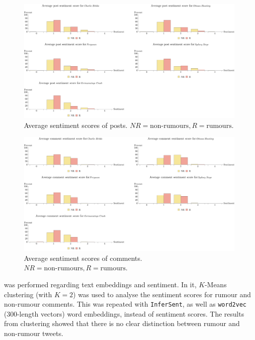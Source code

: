 \begin{figure}[h]
  \myfloatalign
  \includegraphics[width={\textwidth + \marginparsep + \marginparwidth}]{gfx/Experiment_2_1}
  \caption{Average sentiment scores of posts. $NR=\textrm{non-rumours}, R=\textrm{rumours}$.}
  \label{fig:3-exp-2.1}
\end{figure}

\begin{figure}[h]
  \myfloatalign
  \includegraphics[width={\textwidth + \marginparsep + \marginparwidth}]{gfx/Experiment_2_1_comments}
  \caption{Average sentiment scores of comments. $NR=\textrm{non-rumours}, R=\textrm{rumours}$.}
  \label{fig:3-exp-2.1c}
\end{figure}

 was performed regarding text embeddings and sentiment. In it, $K$-Means clustering (with $K=2$) was used to analyse the sentiment scores for rumour and non-rumour comments. This was repeated with \texttt{InferSent}, as well as \texttt{word2vec} (300-length vectors) word embeddings, instead of sentiment scores. The results from clustering showed that there is no clear distinction between rumour and non-rumour tweets.

